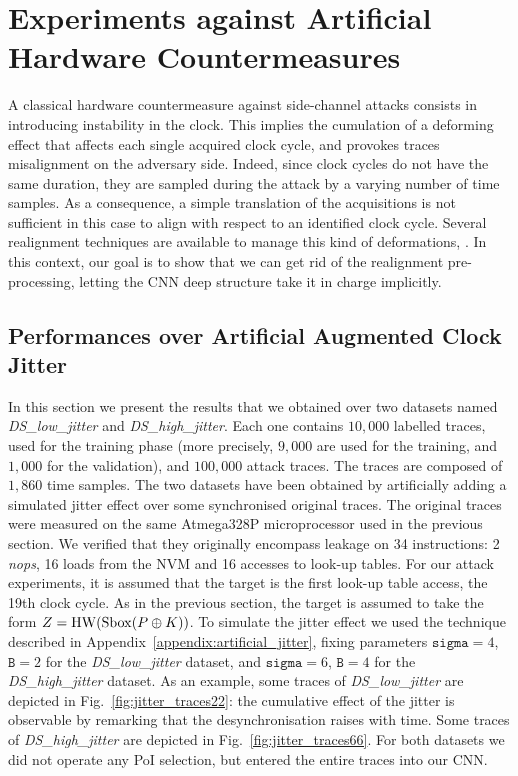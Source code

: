 

\section{Experiments against Artificial Hardware Countermeasures}\label{sec:hard}

A classical hardware countermeasure against side-channel attacks consists in introducing instability in the clock. This implies the cumulation of a deforming effect that affects each single acquired clock cycle, and provokes traces misalignment on the adversary side. Indeed, since clock cycles do not have the same duration, they are sampled during the attack by a varying number of time samples. As a consequence, a simple translation of the acquisitions is not sufficient in this case to align with respect to an identified clock cycle. Several realignment techniques are available to manage this kind of deformations, \eg \cite{van2011improving}. In this context, our goal is to show that  we can get rid of the realignment pre-processing, letting the CNN deep structure take it in charge implicitly. 

\subsection{Performances over Artificial Augmented Clock Jitter}\label{sec:artificial}
In this section we present the results that we obtained over two datasets named \emph{DS\_low\_jitter} and \emph{DS\_high\_jitter}. Each one contains $10,000$ labelled traces, used for the training phase (more precisely, $9,000$ are used for the training, and $1,000$ for the validation), and $100,000$ attack traces. The traces are composed of $1,860$ time samples. The two datasets have been obtained by artificially adding a simulated jitter effect over some synchronised original traces. The original traces were measured on the same Atmega328P microprocessor used in the previous section. We verified that they originally encompass leakage on 34 instructions: 2 \emph{nops}, 16 loads from the NVM and 16 accesses to look-up tables. For our attack experiments, it is assumed that the target is the first look-up table access, \ie the 19th clock cycle. As in the previous section, the target is assumed to take the form $Z=\mathrm{HW}(\mathrm{Sbox}(P\oplus K))$. To simulate the jitter effect we used the technique described in Appendix~\ref{appendix:artificial_jitter}, fixing parameters $\texttt{sigma}=4$, $\texttt{B}=2$ for the \emph{DS\_low\_jitter} dataset,  and $\texttt{sigma}=6$, $\texttt{B}=4$ for the \emph{DS\_high\_jitter} dataset. As an example, some traces of  \emph{DS\_low\_jitter} are depicted in  Fig.~\ref{fig:jitter_traces22}: the cumulative effect of the jitter is observable by remarking that the desynchronisation raises with time. Some traces of \emph{DS\_high\_jitter} are depicted in Fig.~\ref{fig:jitter_traces66}. For both datasets we did not operate any PoI selection, but entered the entire traces into our CNN.


